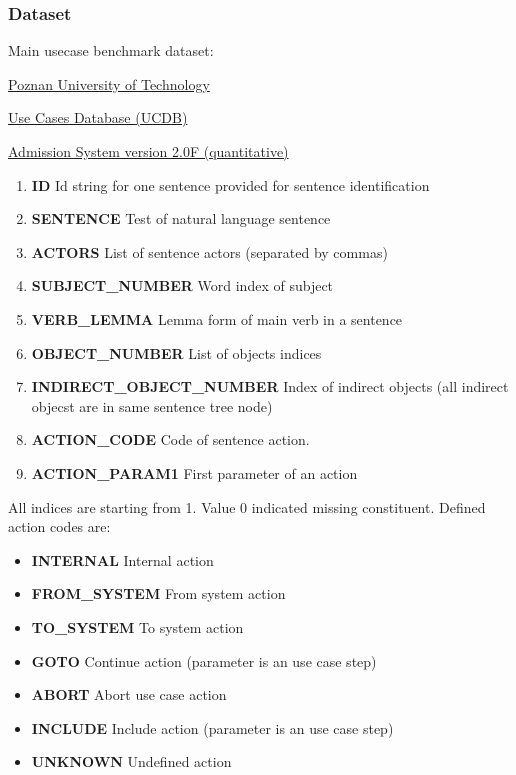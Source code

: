       
\subsubsection{Dataset}

Main usecase benchmark dataset:

\href{http://www2.put.poznan.pl/en}{Poznan University of Technology}

\href{http://www.se.cs.put.poznan.pl/knowledge-base/software-projects-database/use-cases-database-ucdb/use-cases-database-ucdb}{Use Cases Database (UCDB)}

\href{http://ucdb.cs.put.poznan.pl/benchmark/2.f.n/srs/index.html}{Admission System version 2.0F (quantitative)}      

\begin{enumerate}
\item {\bf ID } Id string for one sentence provided for sentence identification
\item {\bf SENTENCE } Test of natural language sentence
\item {\bf ACTORS } List of sentence actors (separated by commas)
\item {\bf SUBJECT\_NUMBER } Word index of subject
\item {\bf VERB\_LEMMA } Lemma form of main verb in a sentence
\item {\bf OBJECT\_NUMBER} List of objects indices
\item {\bf INDIRECT\_OBJECT\_NUMBER} Index of indirect objects (all indirect objecst are in same sentence tree node)
\item {\bf ACTION\_CODE} Code of sentence action. 
\item {\bf ACTION\_PARAM1} First parameter of an action
\end{enumerate}   
   
All indices are starting from 1. Value 0 indicated missing constituent. Defined action codes are:      
     
\begin{itemize}
\item {\bf INTERNAL} Internal action
\item {\bf FROM\_SYSTEM} From system action
\item {\bf TO\_SYSTEM} To system action
\item {\bf GOTO} Continue action (parameter is an use case step)
\item {\bf ABORT} Abort use case action
\item {\bf INCLUDE} Include action (parameter is an use case step)
\item {\bf UNKNOWN} Undefined action
\end{itemize}     
      
